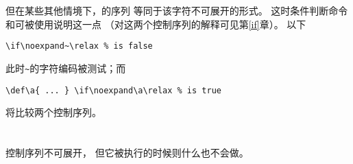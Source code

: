 \documentclass{book}
\begin{document}
但在某些其他情境下，的序列
等同于该字符不可展开的形式。
这时条件判断命令和可被使用说明这一点
（对这两个控制序列的解释可见第\ref{if}章）。
以下
\begin{verbatim}
\if\noexpand~\relax % is false
\end{verbatim}
此时\texttt{\~}的字符编码被测试；而
\begin{verbatim}
\def\a{ ... } \if\noexpand\a\relax % is true
\end{verbatim}
将比较两个控制序列。

\section{\protect{}}

控制序列不可展开，
但它被执行的时候则什么也不会做。
\end{document}
